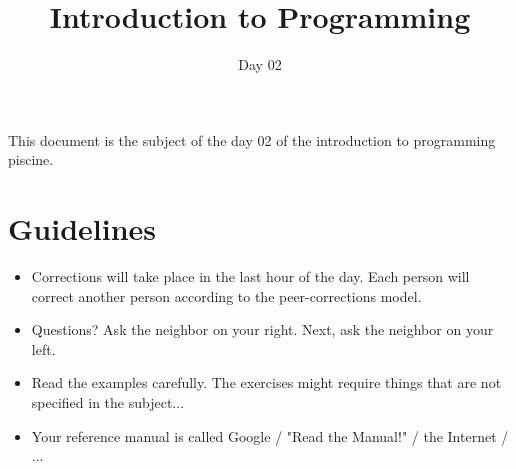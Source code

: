 \documentclass{42-en}
\begin{document}
\title{Introduction to Programming }
\subtitle{Day 02}


\summary
{
This document is the subject of the day 02 of the introduction to programming
piscine.
}

\maketitle

\tableofcontents



\chapter{Guidelines}

\begin{itemize}

  \item Corrections will take place in the last hour of the day. Each person will
  correct another person according to the peer-corrections model.
 
  \item Questions? Ask the neighbor on your right. Next, ask the neighbor on your
  left.
  
  \item Read the examples carefully. The exercises might require things that are
  not specified in the subject...

  \item Your reference manual is called Google / "Read the Manual!" / the Internet
  / ...

\end{itemize}

\newpage

\end{document}
